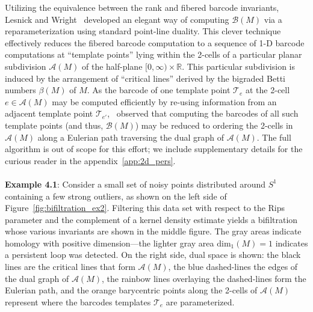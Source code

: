 \documentclass[sn-mathphys]{sn-jnl}
\begin{document}
Utilizing the equivalence between the rank and fibered barcode invariants, Lesnick and Wright~\cite{lesnick2015interactive} developed an elegant way of computing $\mathcal{B}(M)$ via a reparameterization using standard point-line duality. This clever technique effectively reduces the fibered barcode computation to a sequence of 1-D barcode computations at ``template points'' lying within the 2-cells of a particular planar subdivision $\mathcal{A}(M)$ of the half-plane $[0, \infty) \times \mathbb{R}$. This particular subdivision is induced by the arrangement of ``critical lines'' derived by the bigraded Betti numbers $\beta(M)$ of $M$.
As the barcode of one template point $\mathcal{T}_e$ at the 2-cell $e \in \mathcal{A}(M)$ may be computed efficiently by re-using information from an adjacent template point $\mathcal{T}_{e'}$,~\cite{lesnick2015interactive} observed that computing the barcodes of all such template points (and thus, $\mathcal{B}(M)$) may be reduced to ordering the 2-cells in $\mathcal{A}(M)$ along a Eulerian path traversing the dual graph of $\mathcal{A}(M)$. 
The full algorithm is out of scope for this effort; we include supplementary details for the curious reader in the appendix~\ref{app:2d_pers}. 
\\
\\
\noindent 
\textbf{Example 4.1}: Consider a small set of noisy points distributed around $S^1$ containing a few strong outliers, as shown on the left side of Figure~\ref{fig:bifiltration_ex2}. Filtering this data set with respect to the Rips parameter and the complement of a kernel density estimate yields a bifiltration whose various invariants are shown in the middle figure. The gray areas indicate homology with positive dimension---the lighter gray area $\mathrm{dim}_1(M) = 1$ indicates a persistent loop was detected.
On the right side, dual space is shown: the black lines are the critical lines that form $\mathcal{A}(M)$, the blue dashed-lines the edges of the dual graph of $\mathcal{A}(M)$, the rainbow lines overlaying the dashed-lines form the Eulerian path, and the orange barycentric points along the 2-cells of $\mathcal{A}(M)$ represent where the barcodes templates $\mathcal{T}_e$ are parameterized. 
\end{document}
